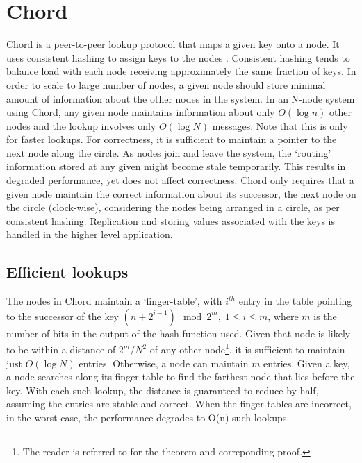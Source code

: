 \documentclass{sig-alternate-10pt}
\begin{document}
\section{Chord} 
Chord is a peer-to-peer lookup protocol that maps a given key onto a node. It uses consistent hashing \cite{consistent-hashing} to assign keys to the nodes \cite{chord}. Consistent hashing tends to balance load with each node receiving approximately the same fraction of keys. In order to scale to large number of nodes, a given node should store minimal amount of information about the other nodes in the system. In an N-node system using Chord, any given node maintains information about only $O(\log n)$ other nodes and the lookup involves only $O(\log N)$ messages. Note that this is only for faster lookups. For correctness, it is sufficient to maintain a pointer to the next node along the circle.
As nodes join and leave the system, the `routing' information stored at any given might become stale temporarily. This results in degraded performance, yet does not affect correctness. Chord only requires that a given node maintain the correct information about its successor, the next node on the circle (clock-wise), considering the nodes being arranged in a circle, as per consistent hashing. Replication and storing values associated with the keys is handled in the higher level application.
\subsection{Efficient lookups}
The nodes in Chord maintain a `finger-table', with $i^{th}$ entry in the table pointing to the successor of the key $(n + 2^{i - 1}) \mod 2^m, \; 1 \leq i \leq m$, where $m$ is the number of bits in the output of the hash function used. Given that node is likely to be within a distance of $2^m/N^2$ of any other node\footnote{The reader is referred to \cite{chord} for the theorem and correponding proof.}, it is sufficient to maintain just $O (\log N)$ entries. Otherwise, a node can maintain $m$ entries. Given a key, a node searches along its finger table to find the farthest node that lies before the key. With each such lookup, the distance is guaranteed to reduce by half, assuming the entries are stable and correct. When the finger tables are incorrect, in the worst case, the performance degrades to O(n) such lookups.
\end{document}
